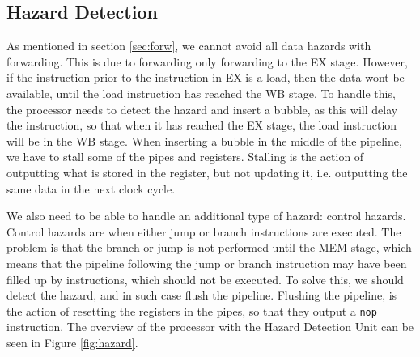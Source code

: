 \subsection{Hazard Detection}\label{sec:haz}
As mentioned in section \ref{sec:forw}, we cannot avoid all data hazards with
forwarding. This is due to forwarding only forwarding to the EX stage. However,
if the instruction prior to the instruction in EX is a load, then the data wont
be available, until the load instruction has reached the WB stage. To handle
this, the processor needs to detect the hazard and insert a bubble, as this
will delay the instruction, so that when it has reached the EX stage, the load
instruction will be in the WB stage. When inserting a bubble in the middle of
the pipeline, we have to stall some of the pipes and registers. Stalling is the
action of outputting what is stored in the register, but not updating it, i.e.
outputting the same data in the next clock cycle.

We also need to be able to handle an additional type of hazard: control
hazards. Control hazards are when either jump or branch instructions are
executed. The problem is that the branch or jump is not performed until the MEM
stage, which means that the pipeline following the jump or branch instruction
may have been filled up by instructions, which should not be executed. To solve
this, we should detect the hazard, and in such case flush the pipeline.
Flushing the pipeline, is the action of resetting the registers in the pipes,
so that they output a \texttt{nop} instruction. The overview of the processor
with the Hazard Detection Unit can be seen in Figure \ref{fig:hazard}.

